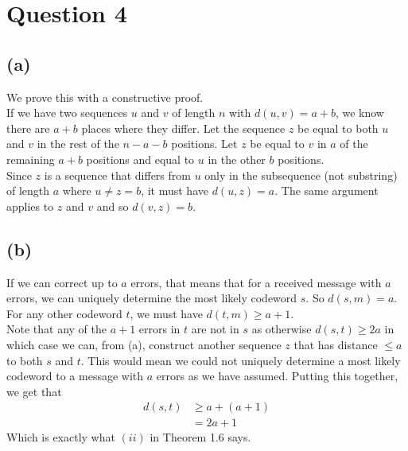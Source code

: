 \documentclass[a4paper, fleqn]{article}
\begin{document}
\section{Question 4}
\subsection{(a)}
We prove this with a constructive proof. \\
If we have two sequences $u$ and $v$ of length $n$ with $d(u,v)=a+b$, we know there are
$a+b$ places where they differ. Let the sequence $z$ be equal to both $u$ and $v$ in the
rest of the $n-a-b$ positions. Let $z$ be equal to $v$ in $a$ of the remaining $a+b$
positions and equal to $u$ in the other $b$ positions. \\
Since $z$ is a sequence that differs from $u$ only in the subsequence (not substring) of length $a$ where $u\neq z=b$, it must have $d(u,z)=a$. The same argument applies to $z$ and $v$ and so $d(v,z)=b$.

\subsection{(b)}
If we can correct up to $a$ errors, that means that for a received message with $a$
errors, we can uniquely determine the most likely codeword $s$. So $d(s,m)=a$. For any
other codeword $t$, we must have $d(t,m)\geq a+1$. \\
Note that any of the $a+1$ errors in $t$ are not in $s$ as otherwise $d(s,t)\geq 2a$ in
which case we can, from (a), construct another sequence $z$ that has distance $\leq a$ to
both $s$ and $t$. This would mean we could not uniquely determine a most likely codeword
to a message with $a$ errors as we have assumed. Putting this together, we get that
\begin{align*}
  d(s,t)&\geq a+(a+1) \\
        &= 2a+1
\end{align*}
Which is exactly what $(ii)$ in Theorem 1.6 says.
\end{document}
